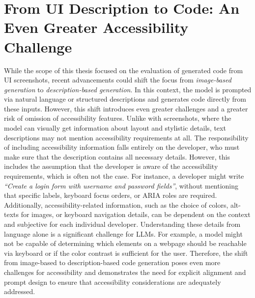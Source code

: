 \newpage
\section{From UI Description to Code: An Even Greater Accessibility Challenge}
While the scope of this thesis focused on the evaluation of 
generated code from UI screenshots, recent advancements could 
shift the focus from \emph{image-based generation} to 
\emph{description-based generation}. In this context, 
the model is prompted via natural language or structured 
descriptions and generates code directly from these inputs.
However, this shift introduces even greater challenges 
and a greater risk of omission of accessibility features.\newline
Unlike with screenshots, where the model can visually get 
information about layout and stylistic details, text 
descriptions may not mention accessibility requirements at all.
The responsibility of including accessibility information falls entirely 
on the developer, who must make sure that the description 
contains all necessary details. However, this includes the 
assumption that the developer is aware of the accessibility requirements, 
which is often not the case. For instance, a developer
might write \textit{``Create a login form with username 
and password fields''}, without mentioning that specific 
labels, keyboard focus orders, or ARIA roles are required.
Additionally, accessibility-related information, such as
the choice of colors, alt-texts for images, or keyboard 
navigation details, can be dependent on the context and 
subjective for each individual developer. Understanding these 
details from language alone is a significant challenge for
LLMs. For example, a model might not be capable of determining
which elements on a webpage should be reachable via keyboard
or if the color contrast is sufficient for the user. \newline
Therefore, the shift from image-based to description-based
code generation poses even more challenges for accessibility and 
demonstrates the need for explicit alignment and prompt design 
to ensure that accessibility considerations are adequately addressed.
